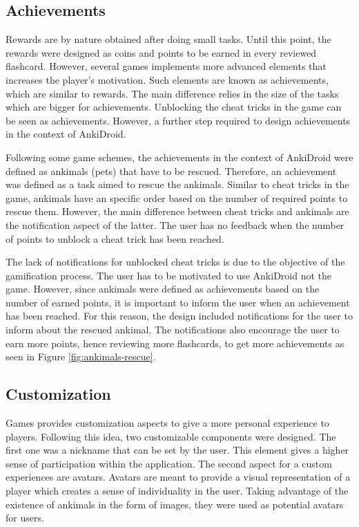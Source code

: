 \subsection{Achievements}
Rewards are by nature obtained after doing small tasks. Until this point, the rewards were designed as coins and points to be earned in every reviewed flashcard. However, several games implements more advanced elements that increases the player's motivation. Such elements are known as achievements, which are similar to rewards. The main difference relies in the size of the tasks which are bigger for achievements. Unblocking the cheat tricks in the game can be seen as achievements. However, a further step required to design achievements in the context of AnkiDroid.

Following some game schemes, the achievements in the context of AnkiDroid were defined as ankimals (pets) that have to be rescued. Therefore, an achievement was defined as a task aimed to rescue the ankimals. Similar to cheat tricks in the game, ankimals have an specific order based on the number of required points to rescue them. However, the main difference between cheat tricks and ankimals are the notification aspect of the latter. The user has no feedback when the number of points to unblock a cheat trick has been reached.

The lack of notifications for unblocked cheat tricks is due to the objective of the gamification process. The user has to be motivated to use AnkiDroid not the game. However, since ankimals were defined as achievements based on the number of earned points, it is important to inform the user when an achievement has been reached. For this reason, the design included notifications for the user to inform about the rescued ankimal. The notifications also encourage the user to earn more points, hence reviewing more flashcards, to get more achievements as seen in Figure \ref{fig:ankimals-rescue}.

\subsection{Customization}
Games provides customization aspects to give a more personal experience to players. Following this idea, two customizable components were designed. The first one was a nickname that can be set by the user. This element gives a higher sense of participation within the application. The second aspect for a custom experiences are avatars. Avatars are meant to provide a visual representation of a player which creates a sense of individuality in the user. Taking advantage of the existence of ankimals in the form of images, they were used as potential avatars for users.

